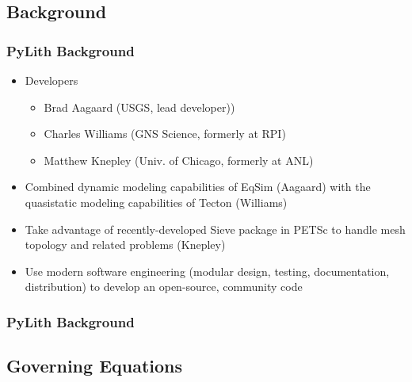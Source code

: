 \documentclass{beamer}
\begin{document}
\subsection{Background}


\begin{frame}
  \frametitle{PyLith Background}
  \summary{}

  \begin{itemize}
  \item Developers
    \begin{itemize}
    \item Brad Aagaard (USGS, lead developer))
    \item Charles Williams (GNS Science, formerly at RPI)
    \item Matthew Knepley (Univ. of Chicago, formerly at ANL)
    \end{itemize}
  \item Combined dynamic modeling capabilities of EqSim (Aagaard) with
    the quasistatic modeling capabilities of Tecton (Williams)
  \item Take advantage of recently-developed Sieve package in PETSc to
    handle mesh topology and related problems (Knepley)
  \item Use modern software engineering (modular design, testing,
    documentation, distribution) to develop an open-source, community code
  \end{itemize}

\end{frame}


\begin{frame}
  \frametitle{PyLith Background}

  

\end{frame}


\subsection{Governing Equations}
\end{document}
